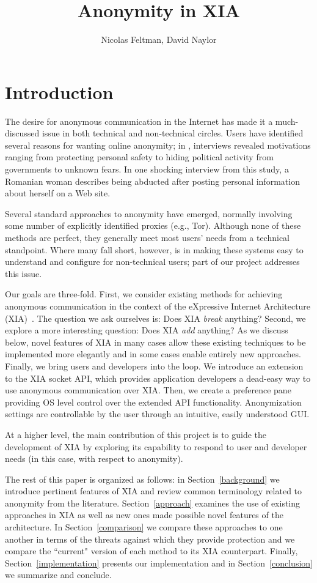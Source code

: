 \documentclass{article}
\title{Anonymity in XIA}
\author{Nicolas Feltman, David Naylor}
\begin{document}
\maketitle

\section{Introduction}
\label{introduction}
The desire for anonymous communication in the Internet has made it a much-discussed issue in both technical and non-technical circles. Users have identified several reasons for wanting online anonymity; in \cite{user-study}, interviews revealed motivations ranging from protecting personal safety to hiding political activity from governments to unknown fears. In one shocking interview from this study, a Romanian woman describes being abducted after posting personal information about herself on a Web site.

Several standard approaches to anonymity have emerged, normally involving some number of explicitly identified proxies (e.g., Tor). Although none of these methods are perfect, they generally meet most users' needs from a technical standpoint. Where many fall short, however, is in making these systems easy to understand and configure for non-technical users; part of our project addresses this issue.

Our goals are three-fold. First, we consider existing methods for achieving anonymous communication in the context of the eXpressive Internet Architecture (XIA)~\cite{xia}. The question we ask ourselves is: Does XIA {\em break} anything? Second, we explore a more interesting question: Does XIA {\em add} anything? As we discuss below, novel features of XIA in many cases allow these existing techniques to be implemented more elegantly and in some cases enable entirely new approaches. Finally, we bring users and developers into the loop. We introduce an extension to the XIA socket API, which provides application developers a dead-easy way to use anonymous communication over XIA. Then, we create a preference pane providing OS level control over the extended API functionality. Anonymization settings are controllable by the user through an intuitive, easily understood GUI.

At a higher level, the main contribution of this project is to guide the development of XIA by exploring its capability to respond to user and developer needs (in this case, with respect to anonymity).

The rest of this paper is organized as follows: in Section~\ref{background} we introduce pertinent features of XIA and review common terminology related to anonymity from the literature. Section~\ref{approach} examines the use of existing approaches in XIA as well as new ones made possible novel features of the architecture. In Section~\ref{comparison} we compare these approaches to one another in terms of the threats against which they provide protection and we compare the ``current" version of each method to its XIA counterpart. Finally, Section~\ref{implementation} presents our implementation and in Section~\ref{conclusion} we summarize and conclude.
\end{document}
